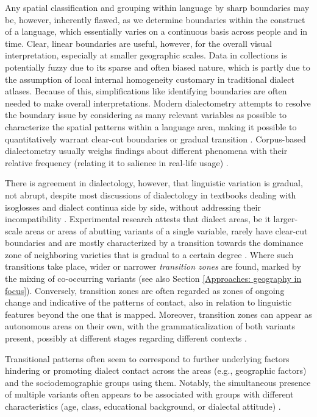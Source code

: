 \documentclass[output=paper]{langscibook}
\begin{document}
Any spatial classification and grouping within language by sharp boundaries may be, however, inherently flawed, as we determine boundaries within the construct of a language, which essentially varies on a continuous basis across people and in time. Clear, linear boundaries are useful, however, for the overall visual interpretation, especially at smaller geographic scales. Data in collections is potentially fuzzy due to its sparse and often biased nature, which is partly due to the assumption of local internal homogeneity customary in traditional dialect atlases. Because of this, simplifications like identifying boundaries are often needed to make overall interpretations. Modern dialectometry attempts to resolve the boundary issue by considering as many relevant variables as possible to characterize the spatial patterns within a language area, making it possible to quantitatively warrant clear-cut boundaries or gradual transition \parencite[e.g., ][]{Seguy1971, Goebl1982, Nerbonne1999, Nerbonne2009DataDriven, Burridge2018}. Corpus-based dialectometry usually weighs findings about different phenomena with their relative frequency (relating it to salience in real-life usage) \parencite[e.g., ][]{Szmrecsanyi2011, Wolk2018}.

There is agreement in dialectology, however, that linguistic variation is gradual, not abrupt, despite most discussions of dialectology in textbooks dealing with isoglosses and dialect continua side by side, without addressing their incompatibility \parencite[][105]{Chambers2004}.
Experimental research attests that dialect areas, be it larger-scale areas or areas of abutting variants of a single variable, rarely have clear-cut boundaries and are mostly characterized by a transition towards the dominance zone of neighboring varieties that is gradual to a certain degree \parencite{Kessler1995,Heeringa2001,Chambers2004, Pickl2012}. Where such transitions take place, wider or narrower \textit{transition zones} are found, marked by the mixing of co-occurring variants (see also Section \ref{Approaches: geography in focus}). Conversely, transition zones are often regarded as zones of ongoing change and indicative of the patterns of contact, also in relation to linguistic features beyond the one that is mapped. Moreover, transition zones can appear as autonomous areas on their own, with the grammaticalization of both variants present, possibly at different stages regarding different contexts \parencite[e.g.,][]{Seiler2004, Willis2017}. 

Transitional patterns often seem to correspond to further underlying factors hindering or promoting dialect contact across the areas (e.g., geographic factors) and the sociodemographic groups using them. Notably, the simultaneous presence of multiple variants often appears to be associated with groups with different characteristics (age, class, educational background, or dialectal attitude) \parencite{Willis2017}.
\end{document}
